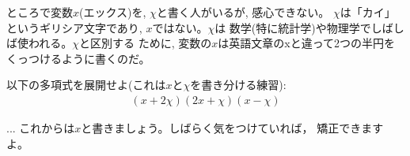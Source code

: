 ところで変数$x$(エックス)を, $\chi$と書く人がいるが, 感心できない。
$\chi$は「カイ」というギリシア文字であり, $x$ではない。$\chi$は
数学(特に統計学)や物理学でしばしば使われる。$\chi$と区別する
ために, 変数の$x$は英語文章のxと違って2つの半円をくっつけるように書くのだ。

\begin{q}\label{q:alg_poly_tenkai01}
 以下の多項式を展開せよ(これは$x$と$\chi$を書き分ける練習):
\begin{eqnarray}(x+2\chi)(2x+\chi)(x-\chi)\end{eqnarray}
\end{q}

\begin{faq}{\small{} ... これからは$x$と書きましょう。しばらく気をつけていれば， 
矯正できますよ。}\end{faq}
\mv

